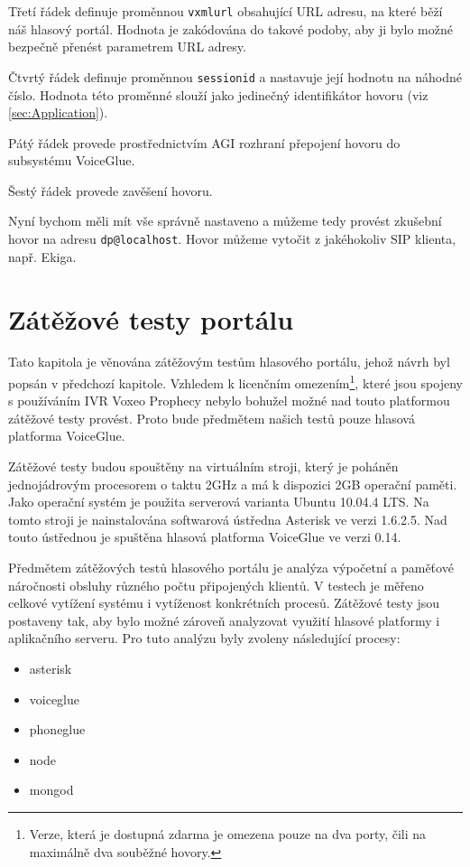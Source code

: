 \documentclass[ing,male,java,dept460]{diploma}						%
\begin{document}
Třetí řádek definuje proměnnou \texttt{vxmlurl} obsahující URL adresu, na které běží náš hlasový portál. Hodnota je zakódována do takové podoby, aby ji bylo možné bezpečně přenést parametrem URL adresy.

Čtvrtý řádek definuje proměnnou \texttt{sessionid} a nastavuje její hodnotu na náhodné číslo. Hodnota této proměnné slouží jako jedinečný identifikátor hovoru (viz \ref{sec:Application}).

Pátý řádek provede prostřednictvím AGI rozhraní přepojení hovoru do subsystému VoiceGlue.

Šestý řádek provede zavěšení hovoru.

Nyní bychom měli mít vše správně nastaveno a můžeme tedy provést zkušební hovor na adresu \texttt{dp@localhost}. Hovor můžeme vytočit z jakéhokoliv SIP klienta, např. Ekiga.

\section{Zátěžové testy portálu}
\label{sec:Benchmark}
Tato kapitola je věnována zátěžovým testům hlasového portálu, jehož návrh byl popsán v předchozí kapitole. Vzhledem k licenčním omezením\footnote{Verze, která je dostupná zdarma je omezena pouze na dva porty, čili na maximálně dva souběžné hovory.}, které jsou spojeny s používáním IVR Voxeo Prophecy nebylo bohužel možné nad touto platformou zátěžové testy provést. Proto bude předmětem našich testů pouze hlasová platforma VoiceGlue.

Zátěžové testy budou spouštěny na virtuálním stroji, který je poháněn jednojádrovým procesorem o taktu 2GHz a má k dispozici 2GB operační paměti. Jako operační systém je použita serverová varianta Ubuntu 10.04.4 LTS. Na tomto stroji je nainstalována softwarová ústředna Asterisk ve verzi 1.6.2.5. Nad touto ústřednou je spuštěna hlasová platforma VoiceGlue ve verzi 0.14.

Předmětem zátěžových testů hlasového portálu je analýza výpočetní a paměťové náročnosti obsluhy různého počtu připojených klientů. V testech je měřeno celkové vytížení systému i vytíženost konkrétních procesů. Zátěžové testy jsou postaveny tak, aby bylo možné zároveň analyzovat využití hlasové platformy i aplikačního serveru. Pro tuto analýzu byly zvoleny následující procesy:

\begin{itemize}
\item asterisk
\item voiceglue
\item phoneglue
\item node
\item mongod
\end{itemize}
\end{document}
